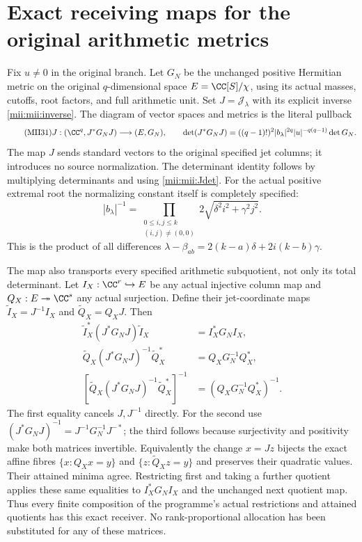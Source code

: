 \documentclass[11pt,a4paper]{article}
\begin{document}
\section{Exact receiving maps for the original arithmetic metrics}
Fix $u\ne0$ in the original branch. Let $G_N$ be the unchanged
positive Hermitian metric on the original $q$-dimensional space
$E=\CC[S]/\chi$, using its actual masses, cutoffs, root factors,
and full arithmetic unit. Set $J=\mathcal J_\lambda$ with its
explicit inverse \eqref{mii:mii:inverse}. The diagram of vector
spaces and metrics is the literal pullback
\begin{equation}\tag{MII31}\label{mii:mii:gram}
 J:(\CC^q,J^*G_NJ)\longrightarrow(E,G_N),\qquad
 \det(J^*G_NJ)=((q-1)!)^2|b_\lambda|^{2q}
                       |u|^{-q(q-1)}\det G_N.
\end{equation}
The map $J$ sends standard vectors to the original specified
jet columns; it introduces no source normalization. The determinant
identity follows by multiplying determinants and using
\eqref{mii:mii:Jdet}. For the actual positive extremal root the
normalizing constant itself is completely specified:
\begin{equation}\tag{MII32}\label{mii:mii:rootproduct}
 |b_\lambda|^{-1}
  =\prod_{\substack{0\le i,j\le k\\(i,j)\ne(0,0)}}
                   2\sqrt{\delta^2 i^2+\gamma^2j^2}.
\end{equation}
This is the product of all differences
$\lambda-\beta_{ab}=2(k-a)\delta+2i(k-b)\gamma$.

The map also transports every specified arithmetic subquotient,
not only its total determinant. Let $I_X:\CC^r\hookrightarrow E$
be any actual injective column map and $Q_X:E\twoheadrightarrow
\CC^s$ any actual surjection. Define their jet-coordinate maps
$\widetilde I_X=J^{-1}I_X$ and $\widetilde Q_X=Q_XJ$.
Then
\begin{equation}\tag{MII33}\label{mii:mii:restrictions}
 \begin{aligned}
 \widetilde I_X^*(J^*G_NJ)\widetilde I_X&=I_X^*G_NI_X,\\
 \widetilde Q_X(J^*G_NJ)^{-1}\widetilde Q_X^*
                         &=Q_XG_N^{-1}Q_X^*,\\
 \left[\widetilde Q_X(J^*G_NJ)^{-1}\widetilde Q_X^*\right]^{-1}
                         &=(Q_XG_N^{-1}Q_X^*)^{-1}.
 \end{aligned}
\end{equation}
The first equality cancels $J,J^{-1}$ directly. For the second
use $(J^*G_NJ)^{-1}=J^{-1}G_N^{-1}J^{-*}$; the third follows
because surjectivity and positivity make both matrices invertible.
Equivalently the change $x=Jz$ bijects the exact affine fibres
$\{x:Q_Xx=y\}$ and $\{z:\widetilde Q_Xz=y\}$ and preserves their
quadratic values. Their attained minima agree. Restricting first
and taking a further quotient applies these same equalities to
$I_X^*G_NI_X$ and the unchanged next quotient map. Thus every
finite composition of the programme's actual restrictions and
attained quotients has this exact receiver. No rank-proportional
allocation has been substituted for any of these matrices.
\end{document}
